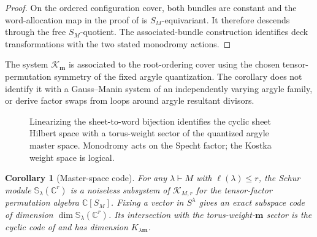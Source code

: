 \documentclass[11pt]{article}
\newtheorem{corollary}[theorem]{Corollary}
\theoremstyle{definition}
\theoremstyle{remark}
\newcommand{\C}{\mathbb C}
\newcommand{\cK}{\mathcal K}
\begin{document}
\begin{proof}
On the ordered configuration cover, both bundles are constant and the word-allocation map in the proof of  is $S_M$-equivariant.  It therefore descends through the free $S_M$-quotient.  The associated-bundle construction identifies deck transformations with the two stated monodromy actions.
\end{proof}

The system $\mathscr K_{\boldsymbol m}$ is associated to the root-ordering cover using the chosen tensor-permutation symmetry of the fixed argyle quantization.  The corollary does not identify it with a Gauss--Manin system of an independently varying argyle family, or derive factor swaps from loops around argyle resultant divisors.

\begin{figure}[t]
\centering
{}
\caption{Linearizing the sheet-to-word bijection identifies the cyclic sheet Hilbert space with a torus-weight sector of the quantized argyle master space.  Monodromy acts on the Specht factor; the Kostka weight space is logical.}
\label{fig:bridge}
\end{figure}

\begin{corollary}[Master-space code]\label{cor:master-code}
For any $\lambda\vdash M$ with $\ell(\lambda)\leq r$, the Schur module $\mathbb S_\lambda(\C^r)$ is a noiseless subsystem of $\cK_{M,r}$ for the tensor-factor permutation algebra $\C[S_M]$.  Fixing a vector in $S^\lambda$ gives an exact subspace code of dimension $\dim\mathbb S_\lambda(\C^r)$.  Its intersection with the torus-weight-$\boldsymbol m$ sector is the cyclic code of  and has dimension $K_{\lambda\boldsymbol m}$.
\end{corollary}
\end{document}
